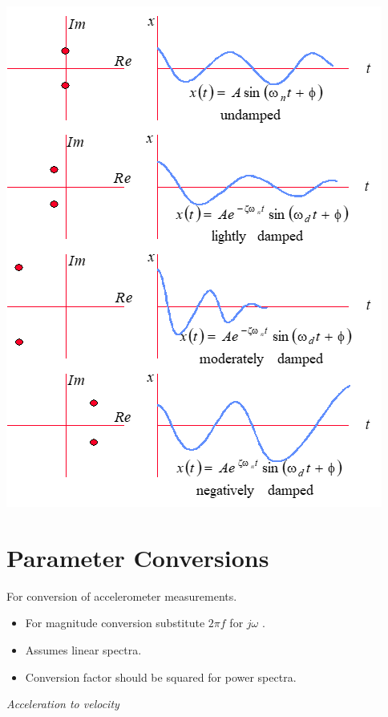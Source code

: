 \documentclass[
]{book}
\providecommand{\tightlist}{%
  \setlength{\itemsep}{0pt}\setlength{\parskip}{0pt}}
\begin{document}
\includegraphics{media/08/image108.png}

\hypertarget{parameter-conversions}{%
\section{Parameter Conversions}\label{parameter-conversions}}

For conversion of accelerometer measurements.

\begin{itemize}
\tightlist
\item
  For magnitude conversion substitute \(2 \pi f\) for \(j \omega\) .
\item
  Assumes linear spectra.
\item
  Conversion factor should be squared for power spectra.
\end{itemize}

\emph{Acceleration to velocity}
\end{document}

